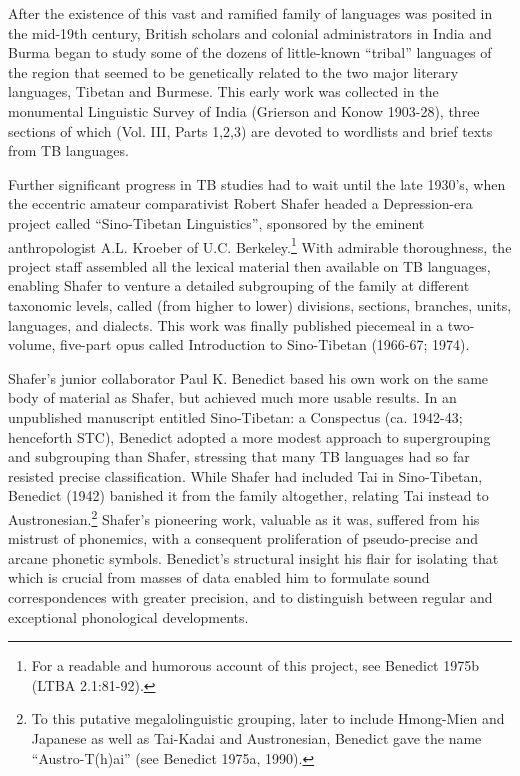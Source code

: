 After the existence of this vast and ramified family of languages was posited in the mid-19th century, British scholars and colonial administrators in India and Burma began to study some of the dozens of little-known ``tribal'' languages of the region that seemed to be genetically related to the two major literary languages, Tibetan and Burmese. This early work was collected in the monumental Linguistic Survey of India (Grierson and Konow 1903-28), three sections of which (Vol. III, Parts 1,2,3) are devoted to wordlists and brief texts from TB languages.

Further significant progress in TB studies had to wait until the late 1930's, when the eccentric amateur comparativist Robert Shafer headed a Depression-era project called ``Sino-Tibetan Linguistics'', sponsored by the eminent anthropologist A.L. Kroeber of U.C. Berkeley.\footnote{For a readable and humorous account of this project, see Benedict 1975b (LTBA 2.1:81-92).} With admirable thoroughness, the project staff assembled all the lexical material then available on TB languages, enabling Shafer to venture a detailed subgrouping of the family at different taxonomic levels, called (from higher to lower) divisions, sections, branches, units, languages, and dialects. This work was finally published piecemeal in a two-volume, five-part opus called Introduction to Sino-Tibetan (1966-67; 1974).

Shafer's junior collaborator Paul K. Benedict based his own work on the same body of material as Shafer, but achieved much more usable results. In an unpublished manuscript entitled Sino-Tibetan: a Conspectus (ca. 1942-43; henceforth STC), Benedict adopted a more modest approach to supergrouping and subgrouping than Shafer, stressing that many TB languages had so far resisted precise classification. While Shafer had included Tai in Sino-Tibetan, Benedict (1942) banished it from the family altogether, relating Tai instead to Austronesian.\footnote{To this putative megalolinguistic grouping, later to include Hmong-Mien and Japanese as well as Tai-Kadai and Austronesian, Benedict gave the name ``Austro-T(h)ai'' (see Benedict 1975a, 1990).} Shafer's pioneering work, valuable as it was, suffered from his mistrust of phonemics, with a consequent proliferation of pseudo-precise and arcane phonetic symbols. Benedict's structural insight  his flair for isolating that which is crucial from masses of data  enabled him to formulate sound correspondences with greater precision, and to distinguish between regular and exceptional phonological developments.

